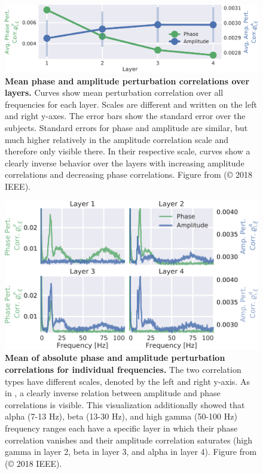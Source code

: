 \begin{figure}[htb]
    \myfloatalign
    \includegraphics[width=1\linewidth]{images/PhaseAmpDev_.pdf-1.png}
    
    \caption[Mean phase and amplitude perturbation correlations over layers]{
\textbf{Mean phase and amplitude perturbation correlations over layers.}
Curves show mean perturbation correlation over all frequencies for each
layer. Scales are different and written on the left and right y-axes.
The error bars show the standard error over the subjects. Standard
errors for phase and amplitude are similar, but much higher relatively
in the amplitude correlation scale and therefore only visible there. In
their respective scale, curves show a clearly inverse behavior over the
layers with increasing amplitude correlations and decreasing phase
correlations. Figure from \citet{hartmann2018hierarchical} (© 2018 IEEE).
}
\label{phase-amp-dev-layer-fig}
\end{figure}


\begin{figure}[htb]
    \myfloatalign
    \includegraphics[width=1\linewidth]{images/PhaseAmp.pdf-1.png}
    
    \caption[Mean of absolute phase and amplitude perturbation correlations
for individual frequencies]{
\textbf{Mean of absolute phase and amplitude perturbation correlations
for individual frequencies.} The two correlation types have different
scales, denoted by the left and right y-axis. As in
, a clearly inverse relation
between amplitude and phase correlations is visible. This visualization
additionally showed that alpha (7-13 Hz), beta (13-30 Hz), and high
gamma (50-100 Hz) frequency ranges each have a specific layer in which
their phase correlation vanishes and their amplitude correlation
saturates (high gamma in layer 2, beta in layer 3, and alpha in layer
4). Figure from \citet{hartmann2018hierarchical} (© 2018 IEEE).
}
\label{phase-amp-layer-fig}
\end{figure}


